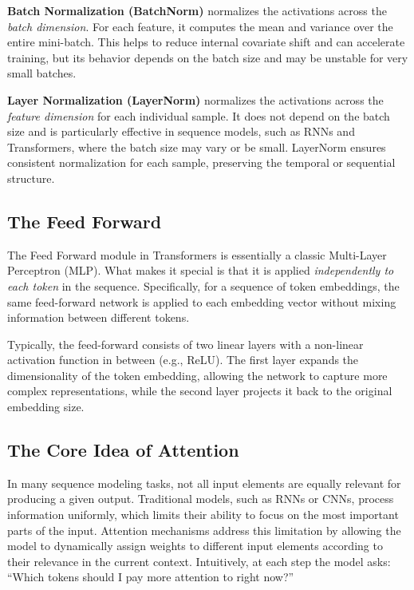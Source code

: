 \begin{infobox}
    \textbf{Batch Normalization (BatchNorm)} normalizes the activations across the \textit{batch dimension}. For each feature, it computes the mean and variance over the entire mini-batch. This helps to reduce internal covariate shift and can accelerate training, but its behavior depends on the batch size and may be unstable for very small batches.
    
    \textbf{Layer Normalization (LayerNorm)} normalizes the activations across the \textit{feature dimension} for each individual sample. It does not depend on the batch size and is particularly effective in sequence models, such as RNNs and Transformers, where the batch size may vary or be small. LayerNorm ensures consistent normalization for each sample, preserving the temporal or sequential structure.
\end{infobox}

\subsection{The Feed Forward}
The Feed Forward module in Transformers is essentially a classic Multi-Layer Perceptron (MLP). What makes it special is that it is applied \textit{independently to each token} in the sequence. Specifically, for a sequence of token embeddings, the same feed-forward network is applied to each embedding vector without mixing information between different tokens. 

Typically, the feed-forward consists of two linear layers with a non-linear activation function in between (e.g., ReLU). The first layer expands the dimensionality of the token embedding, allowing the network to capture more complex representations, while the second layer projects it back to the original embedding size.

\subsection{The Core Idea of Attention}
In many sequence modeling tasks, not all input elements are equally relevant for producing a given output. Traditional models, such as RNNs or CNNs, process information uniformly, which limits their ability to focus on the most important parts of the input. Attention mechanisms address this limitation by allowing the model to dynamically assign weights to different input elements according to their relevance in the current context. Intuitively, at each step the model asks: ``Which tokens should I pay more attention to right now?''

